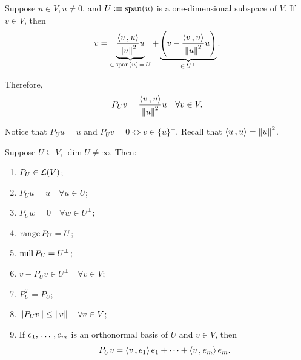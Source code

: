 \begin{example}
  Suppose $u \in V, u\neq 0$, and $U :\equiv \operatorname{span} (u)$ is a one-dimensional subspace of $V$. If $v\in V$, then
  \[
  v
  = \underbrace{\frac{\ip{v}{u}}{\norm{u}^2} u}_{\in \, \myspan{u}\,=\,U} + \underbrace{\left( v- \frac{\ip{v}{u}}{\norm{u}^2} u \right  )}_{\in \, U^\bot}. \]

  Therefore,
  \[
    P_U v = \frac{\ip{v}{u}}{\norm{u}^2} u \quad \forall v \in V.
  \]

  Notice that $P_U u = u$ and $P_U v = 0 \iff v \in \{u\}^\bot$. Recall that $\ip{u}{u} = \norm{u}^2$.
\end{example}

\begin{thm}
  \label{thm: properties orthogonal projection}
  Suppose $U \subseteq V$, $\dim U \neq \infty$. Then:
  \begin{enumerate}[label=\textbf{(\alph*)}]
    \item $P_U \in \mathcal{L}(V)$;
    \item $P_U u = u \quad \forall u \in U$;
    \item $P_U w = 0 \quad \forall w \in U^\bot$;
    \item $\operatorname{range} P_U = U$;
    \item $\operatorname{null} P_U = U^\bot$;
    \item $v-P_U v \in U^\bot \quad \forall v \in V$;
    \item $P_U^2 = P_U$;
    \item $\left \lVert P_U v \right \rVert \leq \left \lVert v \right \rVert \quad \forall v \in V$;
    \item If $e_1, {\, \ldots \,\,}, e_m$ is an orthonormal basis of $U$ and $v \in V$, then
    \[
      P_U v = \ip{v}{e_1}e_1 + \cdots + \ip{v}{e_m}e_m.
    \]
  \end{enumerate}
\end{thm}
